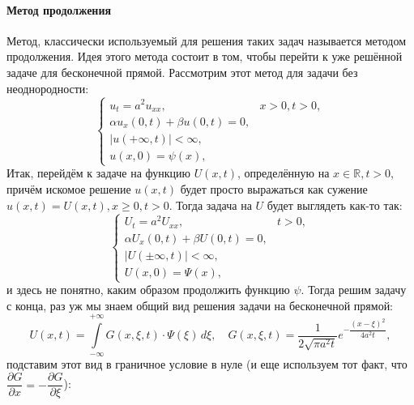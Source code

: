 \paragraph{Метод продолжения}
Метод, классически используемый для решения таких задач называется методом продолжения. Идея этого
метода состоит в том, чтобы перейти к уже решённой задаче для бесконечной прямой. Рассмотрим этот
метод для задачи без неоднородности:
\[
  \begin{cases}
    u_t = a^2 u_{xx}, &x > 0, t > 0, \\
    \alpha u_x(0, t) + \beta u(0, t) = 0, \\
    |u(+\infty, t)| < \infty, \\
    u(x, 0) = \psi(x),
  \end{cases}
\]
Итак, перейдём к задаче на функцию $U(x, t)$, определённую на $x \in \mathbb{R}, t > 0$, причём
искомое решение $u(x, t)$ будет просто выражаться как сужение $u(x, t) = U(x, t), x\geqslant 0, t>0$.
Тогда задача на $U$ будет выглядеть как-то так:
\[
  \begin{cases}
    U_t = a^2 U_{xx}, &t > 0, \\
    \alpha U_x(0, t) + \beta U(0, t) = 0, \\
    |U(\pm \infty, t)| < \infty, \\
    U(x, 0) = \Psi(x),
  \end{cases}
\]
и здесь не понятно, каким образом продолжить функцию $\psi$. Тогда решим задачу с конца, раз уж мы
знаем общий вид решения задачи на бесконечной прямой:
\[
  U(x, t) = \int\limits_{-\infty}^{+\infty} G(x, \xi, t) \cdot \Psi(\xi) \, d\xi, \quad
  G(x, \xi, t) = \dfrac{1}{2\sqrt{\pi a^2 t}} e^{- \dfrac{(x-\xi)^2}{4 a^2 t}},
\]
подставим этот вид в граничное условие в нуле (и еще используем тот факт, что $\dfrac{\partial G}{\partial x} = - \dfrac{\partial G}{\partial \xi}$):
